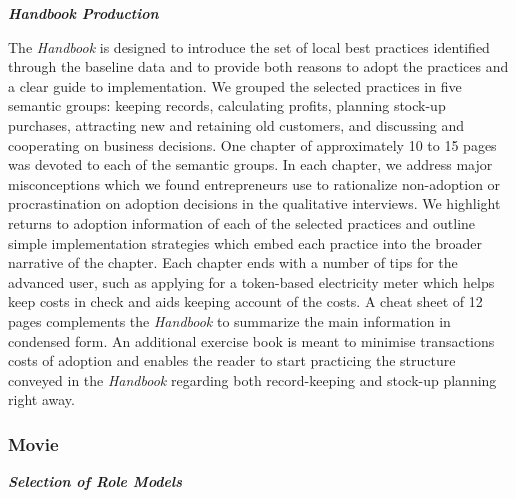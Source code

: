 \documentclass[11.5pt]{article}
\begin{document}
\noindent \emph{\textbf{Handbook Production}}\

The \emph{Handbook} is designed to introduce the set of local best practices identified through the baseline data and to provide both reasons to adopt the practices and a clear guide to implementation. We grouped the selected practices in five semantic groups: keeping records, calculating profits, planning stock-up purchases, attracting new and retaining old customers, and discussing and cooperating on business decisions. One chapter of approximately 10 to 15 pages was devoted to each of the semantic groups. In each chapter, we address major misconceptions which we found entrepreneurs use to rationalize non-adoption or procrastination on adoption decisions in the qualitative interviews. We highlight returns to adoption information of each of the selected practices and outline simple implementation strategies which embed each practice into the broader narrative of the chapter. %
Each chapter ends with a number of tips for the advanced user, such as applying for a token-based electricity meter which helps keep costs in check and aids keeping account of the costs. %
A cheat sheet of 12 pages complements the \emph{Handbook} to summarize the main information in condensed form. An additional exercise book is meant to minimise transactions costs of adoption and enables the reader to start practicing the structure conveyed in the \emph{Handbook} regarding both record-keeping and stock-up planning right away.

\subsubsection{Movie}

\emph{\textbf{Selection of Role Models}}\
\end{document}
